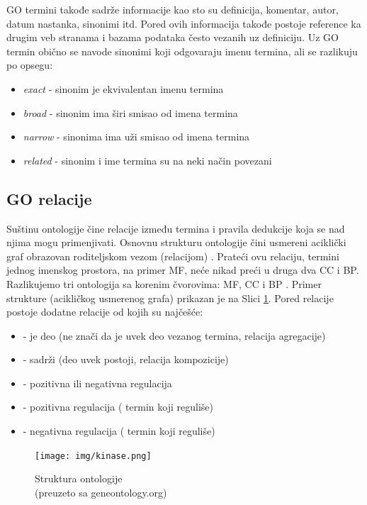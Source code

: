 GO termini takođe sadrže informacije kao sto su definicija, komentar, autor, datum
nastanka, sinonimi itd. Pored ovih informacija takođe postoje reference ka
drugim veb stranama i bazama podataka često vezanih uz definiciju.  Uz GO termin
obično se navode sinonimi koji odgovaraju imenu termina, ali se razlikuju po
opsegu:
\begin{itemize}
  \item \textit{exact} - sinonim je ekvivalentan imenu termina
  \item \textit{broad} - sinonim ima širi smisao od imena termina
  \item \textit{narrow} - sinonima ima uži smisao od imena termina
  \item \textit{related} - sinonim i ime termina su na neki način povezani
\end{itemize}

\subsection{GO relacije}

Suštinu ontologije čine relacije između termina i pravila dedukcije koja se nad
njima mogu primenjivati. Osnovnu strukturu ontologije čini usmereni aciklički
graf  obrazovan roditeljskom vezom (relacijom) . Prateći
ovu relaciju, termini jednog imenskog prostora, na primer MF, neće nikad preći u
druga dva CC i BP. Razlikujemo tri ontologija sa korenim čvorovima:  MF, CC i BP
\parencite{go_struktura}. Primer strukture (acikličkog usmerenog grafa) prikazan je na
Slici \ref{fig:kinase}.  Pored relacije  postoje dodatne relacije od kojih
su najčešće:

\begin{itemize}
  \item {}  - je deo  (ne znači da je uvek deo vezanog termina, relacija agregacije)
  \item {} - sadrži (deo uvek postoji, relacija kompozicije)
  \item {} - pozitivna ili negativna regulacija
  \item {} - pozitivna regulacija  
    ( termin koji reguliše)
  \item {} - negativna regulacija 
    ( termin koji reguliše)
\end{itemize}

\begin{figure}[h!]
  \centering
  \texttt{[image: img/kinase.png]}
  \caption{Struktura ontologije\\ \footnotesize (preuzeto sa geneontology.org)}
  \label{fig:kinase}
\end{figure}


